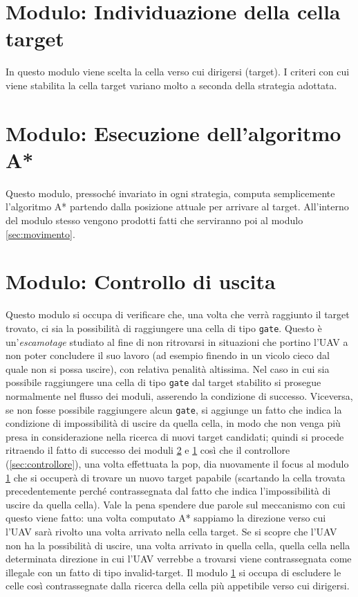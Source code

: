 \section{Modulo: Individuazione della cella target} \label{sec:target}
In questo modulo viene scelta la cella verso cui dirigersi (target). I criteri con cui viene stabilita la cella target variano molto a seconda della strategia adottata.

\section{Modulo: Esecuzione dell'algoritmo A*} \label{sec:astar}
Questo modulo, pressoché invariato in ogni strategia, computa semplicemente l'algoritmo A* partendo dalla posizione attuale per arrivare al target. All'interno del modulo stesso vengono prodotti fatti che serviranno poi al modulo \ref{sec:movimento}.

\section{Modulo: Controllo di uscita} \label{sec:uscita}
Questo modulo si occupa di verificare che, una volta che verrà raggiunto il target trovato, ci sia la possibilità di raggiungere una cella di tipo \texttt{gate}. Questo è un'\emph{escamotage} studiato al fine di non ritrovarsi in situazioni che portino l'UAV a non poter concludere il suo lavoro (ad esempio finendo in un vicolo cieco dal quale non si possa uscire), con relativa penalità altissima.
Nel caso in cui sia possibile raggiungere una cella di tipo \texttt{gate} dal target stabilito si prosegue normalmente nel flusso dei moduli, asserendo la condizione di successo. Viceversa, se non fosse possibile raggiungere alcun \texttt{gate}, si aggiunge un fatto che indica la condizione di impossibilità di uscire da quella cella, in modo che non venga più presa in considerazione nella ricerca di nuovi target candidati; quindi si procede ritraendo il fatto di successo dei moduli \ref{sec:astar} e \ref{sec:target} così che il controllore (\ref{sec:controllore}), una volta effettuata la pop, dia nuovamente il focus al modulo \ref{sec:target} che si occuperà di trovare un nuovo target papabile (scartando la cella trovata precedentemente perché contrassegnata dal fatto che indica l'impossibilità di uscire da quella cella). Vale la pena spendere due parole sul meccanismo con cui questo viene fatto: una volta computato A* sappiamo la direzione verso cui l'UAV sarà rivolto una volta arrivato nella cella target. Se si scopre che l'UAV non ha la possibilità di uscire, una volta arrivato in quella cella, quella cella nella determinata direzione in cui l'UAV verrebbe a trovarsi viene contrassegnata come illegale con un fatto di tipo invalid-target. Il modulo \ref{sec:target} si occupa di escludere le celle così contrassegnate dalla ricerca della cella più appetibile verso cui dirigersi.

